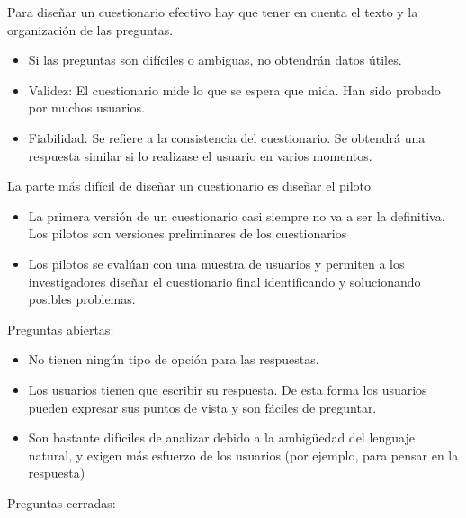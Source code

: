 \documentclass[12pt, twoside, openright]{report} %
\begin{document}
        Para diseñar un cuestionario efectivo hay que tener en cuenta el
        texto y la organización de las preguntas.

        \begin{itemize}
        
        \item
          Si las preguntas son difíciles o ambiguas, no obtendrán datos
          útiles.
        \item
          Validez: El cuestionario mide lo que se espera que mida. Han
          sido probado por muchos usuarios.
        \item
          Fiabilidad: Se refiere a la consistencia del cuestionario. Se
          obtendrá una respuesta similar si lo realizase el usuario en
          varios momentos.
        \end{itemize}

        La parte más difícil de diseñar un cuestionario es diseñar el
        piloto

        \begin{itemize}
        
        \item
          La primera versión de un cuestionario casi siempre no va a ser
          la definitiva. Los pilotos son versiones preliminares de los
          cuestionarios
        \item
          Los pilotos se evalúan con una muestra de usuarios y permiten
          a los investigadores diseñar el cuestionario final
          identificando y solucionando posibles problemas.
        \end{itemize}

        Preguntas abiertas:

        \begin{itemize}
        
        \item
          No tienen ningún tipo de opción para las respuestas.
        \item
          Los usuarios tienen que escribir su respuesta. De esta forma
          los usuarios pueden expresar sus puntos de vista y son fáciles
          de preguntar.
        \item
          Son bastante difíciles de analizar debido a la ambigüedad del
          lenguaje natural, y exigen más esfuerzo de los usuarios (por
          ejemplo, para pensar en la respuesta)
        \end{itemize}

        Preguntas cerradas:
\end{document}
